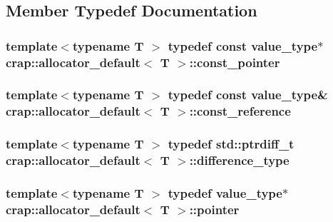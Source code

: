 \subsection{Member Typedef Documentation}
\hypertarget{classcrap_1_1allocator__default_af76e09c744d25c384dd12e3353c60733}{
\subsubsection[{const\-\_\-pointer}]{\setlength{\rightskip}{0pt plus 5cm}template$<$typename T $>$ typedef const {\bf value\-\_\-type}$\ast$ {\bf crap\-::allocator\-\_\-default}$<$ T $>$\-::{\bf const\-\_\-pointer}}}\label{classcrap_1_1allocator__default_af76e09c744d25c384dd12e3353c60733}
\hypertarget{classcrap_1_1allocator__default_a8d3c37bc5001cad948974ad3a0faade5}{
\subsubsection[{const\-\_\-reference}]{\setlength{\rightskip}{0pt plus 5cm}template$<$typename T $>$ typedef const {\bf value\-\_\-type}\& {\bf crap\-::allocator\-\_\-default}$<$ T $>$\-::{\bf const\-\_\-reference}}}\label{classcrap_1_1allocator__default_a8d3c37bc5001cad948974ad3a0faade5}
\hypertarget{classcrap_1_1allocator__default_ae3cf087b680d11388559e3cbc5ab3bbc}{
\subsubsection[{difference\-\_\-type}]{\setlength{\rightskip}{0pt plus 5cm}template$<$typename T $>$ typedef std\-::ptrdiff\-\_\-t {\bf crap\-::allocator\-\_\-default}$<$ T $>$\-::{\bf difference\-\_\-type}}}\label{classcrap_1_1allocator__default_ae3cf087b680d11388559e3cbc5ab3bbc}
\hypertarget{classcrap_1_1allocator__default_a10c26486aa6c8e7b9b1cb7fa1a10b3bd}{
\subsubsection[{pointer}]{\setlength{\rightskip}{0pt plus 5cm}template$<$typename T $>$ typedef {\bf value\-\_\-type}$\ast$ {\bf crap\-::allocator\-\_\-default}$<$ T $>$\-::{\bf pointer}}}\label{classcrap_1_1allocator__default_a10c26486aa6c8e7b9b1cb7fa1a10b3bd}
